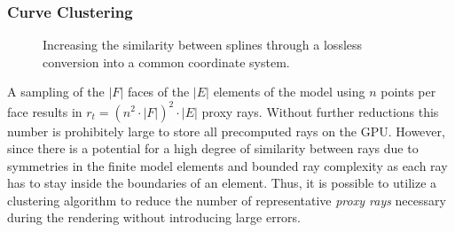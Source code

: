 

\subsubsection{Curve Clustering} \label{contributions:fem:curves}
\begin{figure}
\centering
{}
\caption{Increasing the similarity between splines through a lossless conversion into a common coordinate system.}
\label{contributions:fem:splines}
\end{figure}

A sampling of the $|F|$ faces of the $|E|$ elements of the model using $n$ points per face results in $r_t = \left( n^2 \cdot |F| \right) ^2 \cdot |E|$ proxy rays.  Without further reductions this number is prohibitely large to store all precomputed rays on the GPU.  However, since there is a potential for a high degree of similarity between rays due to symmetries in the finite model elements and bounded ray complexity as each ray has to stay inside the boundaries of an element.  Thus, it is possible to utilize a clustering algorithm to reduce the number of representative \emph{proxy rays} necessary during the rendering without introducing large errors.

